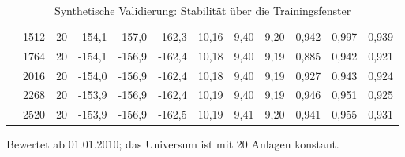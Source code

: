 \begin{table}[htbp]
{\begin{tabular}{lrrrrrrrrrrr}
     & 1512 & 20 & -154,1 & -157,0 & -162,3 & 10,16 & 9,40 & 9,20 & 0,942 & 0,997 & 0,939 \\
     & 1764 & 20 & -154,1 & -156,9 & -162,4 & 10,18 & 9,40 & 9,19 & 0,885 & 0,942 & 0,921 \\
     & 2016 & 20 & -154,0 & -156,9 & -162,4 & 10,18 & 9,40 & 9,19 & 0,927 & 0,943 & 0,924 \\
     & 2268 & 20 & -153,9 & -156,9 & -162,4 & 10,19 & 9,40 & 9,19 & 0,946 & 0,951 & 0,925 \\
     & 2520 & 20 & -153,9 & -156,9 & -162,5 & 10,19 & 9,41 & 9,20 & 0,941 & 0,955 & 0,931 \\
    \bottomrule
  \end{tabular}
  }
  \caption{Synthetische Validierung: Stabilität über die Trainingsfenster}
  \label{tab:synth_stabilitaet}
  \begin{minipage}{\linewidth}\vspace{0.4em}\centering\footnotesize
  Bewertet ab 01.01.2010; das Universum ist mit 20 Anlagen konstant.
  \end{minipage}
\end{table}
